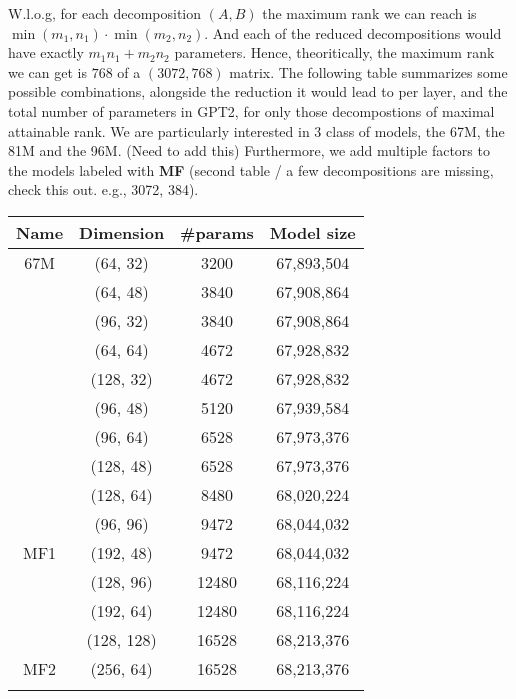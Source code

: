 \documentclass{article}
\begin{document}
{	W.l.o.g, for each decomposition $(A,B)$ the maximum rank we can reach is $\min(m_1,n_1) \cdot \min(m_2,n_2)$. And each of the reduced decompositions would have exactly $m_1 n_1 + m_2 n_2$ parameters. Hence, theoritically, the maximum rank we can get is $768$ of a $(3072, 768)$ matrix. The following table summarizes some possible combinations, alongside the reduction it would lead to per layer, and the total number of parameters in GPT2, for only those decompostions of maximal attainable rank. We are particularly interested in 3 class of models, the 67M, the 81M and the 96M. (Need to add this) Furthermore, we add multiple factors to the models labeled with \textbf{MF} (second table / a few decompositions are missing, check this out. e.g., 3072, 384).
\begin{table}[htb!]
\centering
\begin{tabular}{|c|c|c|c|}
\hline
Name 	& Dimension 		& 	#params 	& Model size\\
\hline
67M		&  (64, 32)         &   3200       & 67,893,504  \\ \hline 
		&  (64, 48)         &   3840       & 67,908,864  \\ \hline 
		&  (96, 32)         &   3840       & 67,908,864  \\ \hline
		&  (64, 64)         &   4672       & 67,928,832  \\ \hline
		&  (128, 32)        &   4672       & 67,928,832  \\ \hline 
		&  (96, 48)         &   5120       & 67,939,584  \\ \hline 
		&  (96, 64)         &   6528       & 67,973,376  \\ \hline
		&  (128, 48)        &   6528       & 67,973,376  \\ \hline
		&  (128, 64)        &   8480       & 68,020,224  \\ \hline 
		&  (96, 96)         &   9472       & 68,044,032  \\ \hline 
MF1		&  (192, 48)        &   9472       & 68,044,032  \\ \hline
		&  (128, 96)        &   12480      & 68,116,224  \\ \hline
		&  (192, 64)        &   12480      & 68,116,224  \\ \hline 
		&  (128, 128)       &   16528      & 68,213,376  \\ \hline 
MF2		&  (256, 64)        &   16528      & 68,213,376  \\ \hline
		&  \cdots &   \cdots    & \cdots \\ \hline

\end{tabular}
\end{table}}
\end{document}
